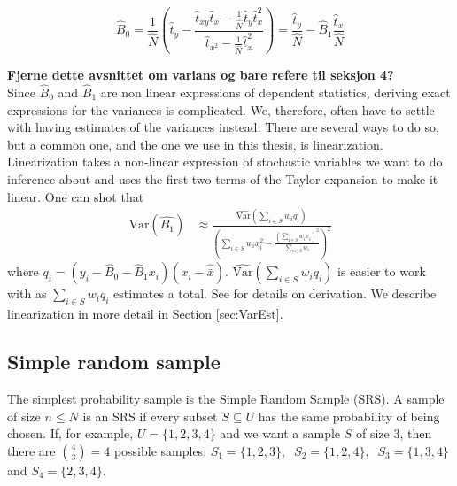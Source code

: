 \documentclass{article}
\begin{document}
\begin{equation*}
 \hat{B}_0 = \frac{1}{\widehat{N}} \left( \hat{t}_y - \frac{\hat{t}_{xy} \hat{t}_x - \frac{1}{\widehat{N}} \hat{t}_y \hat{t}_x^2}
   {\hat{t}_{x^2} - \frac{1}{\widehat{N}} \hat{t}_x^2}
 \right)
 = \frac{\hat{t}_y}{\hat{N}} - \hat{B}_1\frac{\hat{t}_x}{\hat{N}}
\end{equation*}

\textbf{Fjerne dette avsnittet om varians og bare refere til seksjon 4?}\\
Since \(\hat{B}_0\) and \(\hat{B}_1\) are non linear expressions of dependent
statistics, deriving exact expressions for the variances is complicated. We, therefore,
often have to settle with having estimates of the variances instead.
There are several ways to do so, but a common one,
and the one we use in this thesis, is linearization. Linearization takes a
non-linear expression of stochastic variables we want to do inference about and uses
the first two terms of the Taylor expansion to make it linear.
One can shot that
\begin{align*}
 \mathrm{Var}(\hat{B_1})
 &\approx \frac{\widehat{\mathrm{Var}}\left( \sum_{i \in S} w_i q_i \right)}
   {\left( \sum_{i \in S} w_i x_i^2 - \frac{\left( \sum_{i \in S} w_i x_i \right)^2}{\sum_{i \in S} w_i} \right)^2}
\end{align*}
where \(q_i = (y_i - \hat{B}_0 - \hat{B}_1 x_i)(x_i - \hat{\bar{x}})\).
\(\widehat{\mathrm{Var}}\left( \sum_{i \in S} w_i q_i \right)\) is easier to
work with as \(\sum_{i \in S} w_i q_i\) estimates a total. See \cite[Chapter
11.2.2]{sampReg} for details on derivation. We describe linearization in more
detail in Section \ref{sec:VarEst}.


\subsection{Simple random sample} \label{sec:SRS}

The simplest probability sample is the Simple Random Sample (SRS). A
sample of size \(n \leq N\) is an SRS if every subset \(S \subseteq U\) has the same
probability of being chosen.
If, for example, \(U = \{1, 2, 3, 4\}\) and we want a sample \(S\) of
size \(3\), then there are \(\binom{4}{3} = 4\)  possible samples:
\( S_1 = \{1, 2, 3\},\ \)
\( S_2 = \{1, 2, 4\},\ \)
\( S_3 = \{1, 3, 4\}\ \) and
\( S_4 = \{2, 3, 4\} \).
\end{document}
